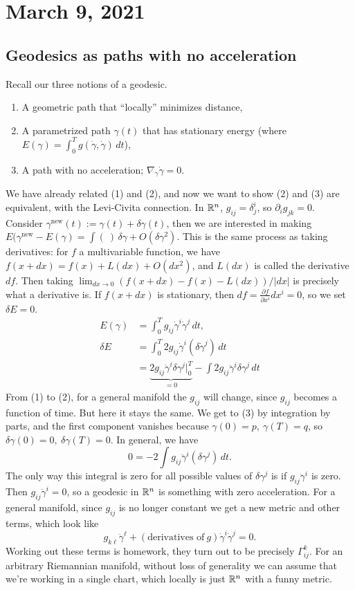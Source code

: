 \section{March 9, 2021} 

\subsection{Geodesics as paths with no acceleration}
Recall our three notions of a geodesic. 
\begin{enumerate}[label=(\arabic*)]
    \setlength\itemsep{-.2em}
    \item A geometric path that ``locally'' minimizes distance,
    \item A parametrized path $\gamma (t)$ that has stationary energy (where $E(\gamma )=\int_{0}^{T} g(\dot \gamma ,\dot \gamma ) \, dt$),
    \item A path with no acceleration; $\nabla _{\dot \gamma }\dot \gamma =0$.
\end{enumerate}
We have already related (1) and (2), and now we want to show (2) and (3) are equivalent, with the Levi-Civita connection. In $\mathbb{R}^n $, $g_{ij}=\delta^i _j $, so $\partial _i g_{jk}=0$. Consider $\gamma^{\text{new} } (t) :=\gamma (t)+\delta \gamma (t)$, then we are interested in making $E(\gamma ^{\text{new}}-E(\gamma )=\int (\ )\,\delta \gamma +O(\delta \gamma ^2) $. This is the same process as taking derivatives: for $f$ a multivariable function, we have $f(x+dx)=f(x)+L(dx)+O(dx^2)$, and $L(dx)$ is called the derivative $df$. Then taking $\lim _{dx\to 0}(f(x+dx)-f(x)-L(dx))/|dx|$ is precisely what a derivative is. If $f(x+dx)$ is stationary, then $df=\frac{\partial f}{\partial x^i }dx^i =0$, so we set $\delta E=0$. 
\begin{align}
    E(\gamma )&=\int_{0}^{T} g_{ij}\dot \gamma ^i \dot \gamma ^j  \, dt,\\
    \delta E&= \int_{0}^{T} 2g_{ij}\dot \gamma ^i (\delta \dot\gamma ^j)  \, dt\\
            &=\underset{=0}{\underbrace{ 2g_{ij}\dot \gamma ^i \delta \gamma ^j \Big|_0^T}} - \int 2g_{ij}\ddot \gamma ^i \delta \gamma ^j  \, dt
\end{align}
From (1) to (2), for a general manifold the $g_{ij}$ will change, since $g_{ij}$ becomes a function of time. But here it stays the same. We get to (3) by integration by parts, and the first component vanishes because $\gamma (0)=p,\ \gamma (T)=q$, so $\delta \gamma (0)=0,\ \delta \gamma (T)=0$. In general, we have \[
    0=-2 \int g_{ij}\ddot \gamma ^i (\delta \gamma ^j ) \, dt.
\] The only way this integral is zero for all possible values of $\delta \gamma ^j $ is if $g_{ij}\ddot \gamma ^i $ is zero. Then $g_{ij}\ddot \gamma ^i =0$, so a geodesic in $\mathbb{R}^n $ is something with zero acceleration. For a general manifold, since $g_{ij}$ is no longer constant we get a new metric and other terms, which look like \[
g_{k\ell}\ddot \gamma ^{\ell}+(\text{derivatives of} \ g)\dot \gamma ^i \dot \gamma ^j =0.
\] Working out these terms is homework, they turn out to be precisely $\Gamma _{ij}^k$. For an arbitrary Riemannian manifold, without loss of generality we can assume that we're working in a single chart, which locally is just $\mathbb{R}^n $ with a funny metric.


